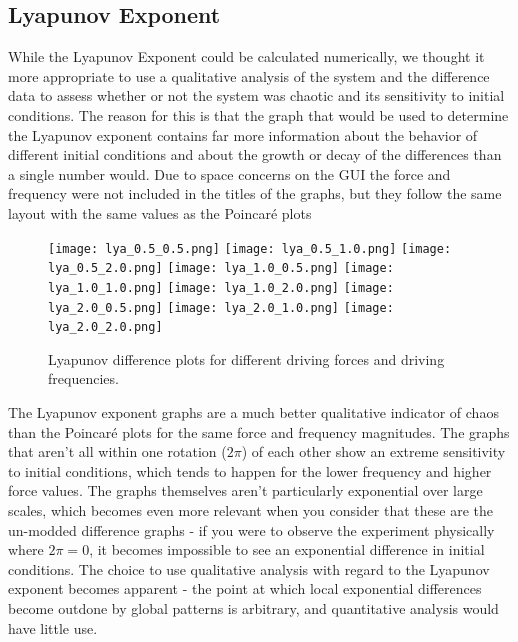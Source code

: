 \documentclass[11pt]{article} %
\begin{document}
    \subsection{Lyapunov Exponent}
    While the Lyapunov Exponent could be calculated numerically, we thought it more appropriate to use a qualitative analysis of the system and
    the difference data to assess whether or not the system was chaotic and its sensitivity to initial conditions. The reason for this is that
    the graph that would be used to determine the Lyapunov exponent contains far more information about the behavior of different initial conditions
    and about the growth or decay of the differences than a single number would. Due to space concerns on the GUI the force and frequency were not
    included in the titles of the graphs, but they follow the same layout with the same values as the Poincar\'e plots
    \begin{figure}[H]
        \centering
        \texttt{[image: lya\_0.5\_0.5.png]}
        \texttt{[image: lya\_0.5\_1.0.png]}
        \texttt{[image: lya\_0.5\_2.0.png]}
        \texttt{[image: lya\_1.0\_0.5.png]}
        \texttt{[image: lya\_1.0\_1.0.png]}
        \texttt{[image: lya\_1.0\_2.0.png]}
        \texttt{[image: lya\_2.0\_0.5.png]}
        \texttt{[image: lya\_2.0\_1.0.png]}
        \texttt{[image: lya\_2.0\_2.0.png]}
        \caption{Lyapunov difference plots for different driving forces and driving frequencies.}
    \end{figure}
    The Lyapunov exponent graphs are a much better qualitative indicator of chaos than the Poincar\'e plots for the same force and frequency
    magnitudes. The graphs that aren't all within one rotation ($2\pi$) of each other show an extreme sensitivity to initial conditions, which
    tends to happen for the lower frequency and higher force values. The graphs themselves aren't particularly exponential over large scales, which
    becomes even more relevant when you consider that these are the un-modded difference graphs - if you were to observe the experiment physically
    where $2\pi = 0$, it becomes impossible to see an exponential difference in initial conditions. The choice to use qualitative analysis with regard
    to the Lyapunov exponent becomes apparent - the point at which local exponential differences become outdone by global patterns is arbitrary, and
    quantitative analysis would have little use.\\
\end{document}
